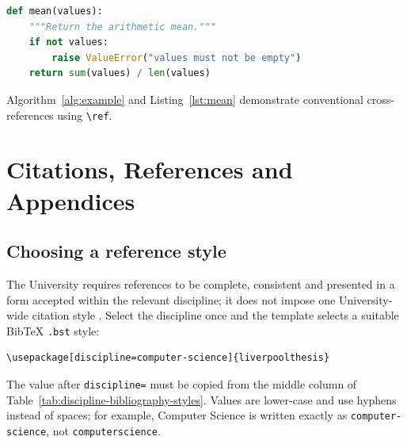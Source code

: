 \documentclass[oneside,header=auto]{liverpoolthesis}
\begin{document}
\begin{lstlisting}[language=Python,caption={Example source-code presentation.},label={lst:mean}]
def mean(values):
    """Return the arithmetic mean."""
    if not values:
        raise ValueError("values must not be empty")
    return sum(values) / len(values)
\end{lstlisting}

Algorithm~\ref{alg:example} and Listing~\ref{lst:mean} demonstrate conventional cross-references using \verb|\ref|.

\chapter{Citations, References and Appendices}

\section{Choosing a reference style}

The University requires references to be complete, consistent and presented in a form accepted within the relevant discipline; it does not impose one University-wide citation style \citep{uolformatting}. Select the discipline once and the template selects a suitable BibTeX \texttt{.bst} style:

\begin{lstlisting}[language={[LaTeX]TeX}]
\usepackage[discipline=computer-science]{liverpoolthesis}
\end{lstlisting}

The value after \texttt{discipline=} must be copied from the middle column of Table~\ref{tab:discipline-bibliography-styles}. Values are lower-case and use hyphens instead of spaces; for example, Computer Science is written exactly as \texttt{computer-science}, not \texttt{computerscience}.
\end{document}
